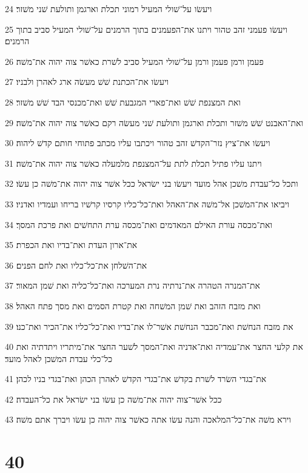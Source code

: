 \par 24 ויעשׂו על־שׁולי המעיל רמוני תכלת וארגמן ותולעת שׁני משׁזר׃
\par 25 ויעשׂו פעמני זהב טהור ויתנו את־הפעמנים בתוך הרמנים על־שׁולי המעיל סביב בתוך הרמנים׃
\par 26 פעמן ורמן פעמן ורמן על־שׁולי המעיל סביב לשׁרת כאשׁר צוה יהוה את־משׁה׃
\par 27 ויעשׂו את־הכתנת שׁשׁ מעשׂה ארג לאהרן ולבניו׃
\par 28 ואת המצנפת שׁשׁ ואת־פארי המגבעת שׁשׁ ואת־מכנסי הבד שׁשׁ משׁזר׃
\par 29 ואת־האבנט שׁשׁ משׁזר ותכלת וארגמן ותולעת שׁני מעשׂה רקם כאשׁר צוה יהוה את־משׁה׃
\par 30 ויעשׂו את־ציץ נזר־הקדשׁ זהב טהור ויכתבו עליו מכתב פתוחי חותם קדשׁ ליהוה׃
\par 31 ויתנו עליו פתיל תכלת לתת על־המצנפת מלמעלה כאשׁר צוה יהוה את־משׁה׃
\par 32 ותכל כל־עבדת משׁכן אהל מועד ויעשׂו בני ישׂראל ככל אשׁר צוה יהוה את־משׁה כן עשׂו׃
\par 33 ויביאו את־המשׁכן אל־משׁה את־האהל ואת־כל־כליו קרסיו קרשׁיו בריחו ועמדיו ואדניו׃
\par 34 ואת־מכסה עורת האילם המאדמים ואת־מכסה ערת התחשׁים ואת פרכת המסך׃
\par 35 את־ארון העדת ואת־בדיו ואת הכפרת׃
\par 36 את־השׁלחן את־כל־כליו ואת לחם הפנים׃
\par 37 את־המנרה הטהרה את־נרתיה נרת המערכה ואת־כל־כליה ואת שׁמן המאור׃
\par 38 ואת מזבח הזהב ואת שׁמן המשׁחה ואת קטרת הסמים ואת מסך פתח האהל׃
\par 39 את מזבח הנחשׁת ואת־מכבר הנחשׁת אשׁר־לו את־בדיו ואת־כל־כליו את־הכיר ואת־כנו׃
\par 40 את קלעי החצר את־עמדיה ואת־אדניה ואת־המסך לשׁער החצר את־מיתריו ויתדתיה ואת כל־כלי עבדת המשׁכן לאהל מועד׃
\par 41 את־בגדי השׂרד לשׁרת בקדשׁ את־בגדי הקדשׁ לאהרן הכהן ואת־בגדי בניו לכהן׃
\par 42 ככל אשׁר־צוה יהוה את־משׁה כן עשׂו בני ישׂראל את כל־העבדה׃
\par 43 וירא משׁה את־כל־המלאכה והנה עשׂו אתה כאשׁר צוה יהוה כן עשׂו ויברך אתם משׁה׃

\chapter{40}

